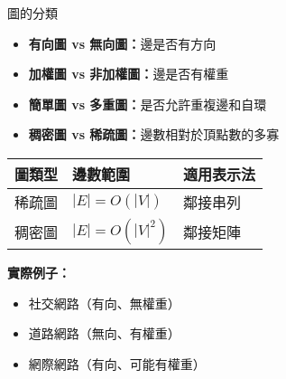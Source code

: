 \documentclass{beamer}
\begin{document}
\begin{frame}{圖的分類}
\begin{itemize}
    \item \textbf{有向圖 vs 無向圖：}邊是否有方向
    \item \textbf{加權圖 vs 非加權圖：}邊是否有權重
    \item \textbf{簡單圖 vs 多重圖：}是否允許重複邊和自環
    \item \textbf{稠密圖 vs 稀疏圖：}邊數相對於頂點數的多寡
\end{itemize}

\vspace{1em}
\begin{center}
\renewcommand{\arraystretch}{1.3}
\begin{tabular}{|>{\centering\arraybackslash}m{3cm}|>{\centering\arraybackslash}m{3cm}|>{\centering\arraybackslash}m{3cm}|}
\hline
\textbf{圖類型} & \textbf{邊數範圍} & \textbf{適用表示法} \\
\hline
稀疏圖 & $|E| = O(|V|)$ & 鄰接串列 \\
\hline
稠密圖 & $|E| = O(|V|^2)$ & 鄰接矩陣 \\
\hline
\end{tabular}
\end{center}

\vspace{1em}
\textbf{實際例子：}
\begin{itemize}
    \item 社交網路（有向、無權重）
    \item 道路網路（無向、有權重）
    \item 網際網路（有向、可能有權重）
\end{itemize}
\end{frame}
\end{document}
